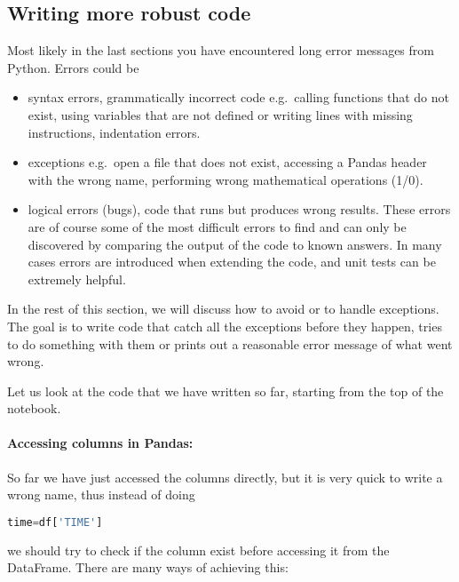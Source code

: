 \documentclass[graybox,sectrefs,envcountresetchap,open=right,final]{svmonodo}
\begin{document}
\subsection{Writing more robust code}
Most likely in the last sections you have encountered long error messages from Python. Errors could be
\begin{itemize}
\item syntax errors, grammatically incorrect code e.g.~calling functions that do not exist, using variables that are not defined or writing lines with missing instructions, indentation errors. 

\item exceptions e.g.~open a file that does not exist, accessing a Pandas header with the wrong name, performing wrong mathematical operations (1/0).

\item logical errors (bugs), code that runs but produces wrong results. These errors are of course some of the most difficult errors to find and can only be discovered by comparing the output of the code to known answers. In many cases errors are introduced when extending the code, and unit tests can be extremely helpful.
\end{itemize}

\noindent
In the rest of this section, we will discuss how to avoid or to handle exceptions. The goal is to write code that catch all the exceptions before they happen, tries to do something with them or prints out a reasonable error message of what went wrong.

Let us look at the code that we have written so far, starting from the top of the notebook.

\paragraph{Accessing columns in Pandas:}
So far we have just accessed the columns directly, but it is very quick to write a wrong name, thus instead of doing


\begin{lstlisting}[language=python,style=blue1bar]
time=df['TIME']

\end{lstlisting}

we should try to check if the column exist before accessing it from the DataFrame. There are many ways of achieving this:
\end{document}
